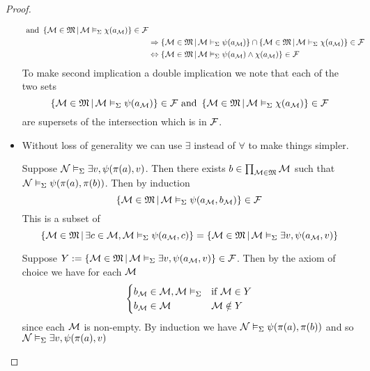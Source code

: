 \begin{proof}
\begin{itemize}
\begin{align*}
                \text{ and }
                \left\{\mathcal{M} \in \mathfrak{M} \,|\, \mathcal{M} \vDash_{\Sigma} \chi(a_{\mathcal{M}})\right\}\in \mathcal{F}\\
                &\Rightarrow 
                \left\{\mathcal{M} \in \mathfrak{M} \,|\, \mathcal{M} \vDash_{\Sigma} \psi(a_{\mathcal{M}})\right\}
                \cap 
                \left\{\mathcal{M} \in \mathfrak{M} \,|\, \mathcal{M} \vDash_{\Sigma} \chi(a_{\mathcal{M}})\right\}\in \mathcal{F}\\
                &\Leftrightarrow
                \left\{\mathcal{M} \in \mathfrak{M} \,|\, \mathcal{M} \vDash_{\Sigma} 
                \psi(a_{\mathcal{M}}) \land \chi(a_{\mathcal{M}})\right\}\in \mathcal{F}
            \end{align*}
            To make second implication a double implication we note that 
            each of the two sets 
            \[\left\{\mathcal{M} \in \mathfrak{M} \,|\, \mathcal{M} \vDash_{\Sigma} \psi(a_{\mathcal{M}})\right\} \in \mathcal{F}
            \text{ and }
            \left\{\mathcal{M} \in \mathfrak{M} \,|\, \mathcal{M} \vDash_{\Sigma} \chi(a_{\mathcal{M}})\right\}\in \mathcal{F}\]
            are supersets of the intersection which is in $\mathcal{F}$.
        \item Without loss of generality we can use $\exists$ instead of 
            $\forall$ to make things simpler.
            \begin{forward}
                Suppose $\mathcal{N} \vDash_{\Sigma} \exists v, \psi(\pi(a),v)$.
                Then there exists $b \in \prod_{\mathcal{M} \in \mathfrak{M}} \mathcal{M}$ such that 
                $\mathcal{N} \vDash_{\Sigma} \psi(\pi(a),\pi(b))$.
                Then by induction 
                \[\left\{\mathcal{M} \in \mathfrak{M} \,|\, \mathcal{M} \vDash_{\Sigma} \psi(a_{\mathcal{M}},b_{\mathcal{M}})\right\}
                \in \mathcal{F}\]
                This is a subset of 
                \[  
                    \left\{\mathcal{M} \in \mathfrak{M} \,|\, \exists c \in \mathcal{M}, \mathcal{M} \vDash_{\Sigma} 
                    \psi(a_{\mathcal{M}},c)\right\} = 
                    \left\{\mathcal{M} \in \mathfrak{M} \,|\, \mathcal{M} \vDash_{\Sigma} 
                    \exists v, \psi(a_{\mathcal{M}},v)\right\}
                \]
            \end{forward}
            \begin{backward}
                Suppose $Y:=\left\{\mathcal{M} \in \mathfrak{M} \,|\, \mathcal{M} \vDash_{\Sigma} 
                \exists v, \psi(a_{\mathcal{M}},v)\right\} \in \mathcal{F}$.
                Then by the axiom of choice we have for each $\mathcal{M}$
                \[\begin{cases}
                    b_{\mathcal{M}} \in \mathcal{M}, \mathcal{M} \vDash_{\Sigma} &\text{if } \mathcal{M} \in Y\\
                    b_{\mathcal{M}} \in \mathcal{M}   &\mathcal{M} \notin Y
                \end{cases}\]
                since each $\mathcal{M}$ is non-empty.
                By induction we have 
                $\mathcal{N} \vDash_{\Sigma} \psi(\pi(a),\pi(b))$
                and so $\mathcal{N} \vDash_{\Sigma} \exists v, \psi(\pi(a),v)$
            \end{backward}
    \end{itemize}
\end{proof}

